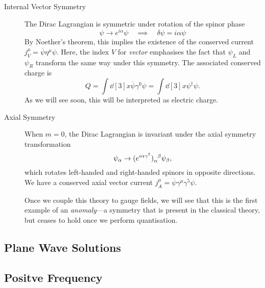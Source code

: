 \begin{description}
\begin{equation}
    \end{equation}
  \item[Internal Vector Symmetry]
    The Dirac Lagrangian is symmetric under rotation of the spinor phase
    \begin{equation}
      \psi \to e^{i\alpha} \psi \quad \implies \quad \delta \psi = i \alpha \psi
    \end{equation}
    By Noether's theorem, this implies the existence of the conserved current $j^{\mu}_V = \overline{\psi} \eta^{\mu} \psi$.
    Here, the index $V$ for \emph{vector} emphasises the fact that $\psi_L$ and $\psi_R$ transform the same way under this symmetry.
    The associated conserved charge is 
    \begin{equation}
      Q = \int \dd[3]{x} \overline{\psi} \gamma^0 \psi = \int \dd[3]{x} \psi^{\dagger} \psi.
    \end{equation}
    As we will see soon, this will be interpreted as electric charge.
  \item[Axial Symmetry]
    When $m = 0$, the Dirac Lagrangian is invariant under the axial symmetry transformation
    \begin{equation}
      \psi_{\alpha} \to (e^{i\alpha \gamma^5}) \indices{_{\alpha}^{\beta}} \psi_{\beta},
    \end{equation}
    which rotates left-handed and right-handed spinors in opposite directions. We have a conserved axial vector current $j^{\mu}_{A} = \overline{\psi} \gamma^{\mu} \gamma^5 \psi$.
    \begin{leftbar}
      \begin{remark}
	Once we couple this theory to gauge fields, we will see that this is the first example of an \emph{anomaly}---a symmetry that is present in the classical theory, but ceases to hold once we perform quantisation.
      \end{remark}
    \end{leftbar}
\end{description}

\subsection{Plane Wave Solutions}%
\label{sub:plane_wave_solutions}

\subsection*{Positve Frequency}%

